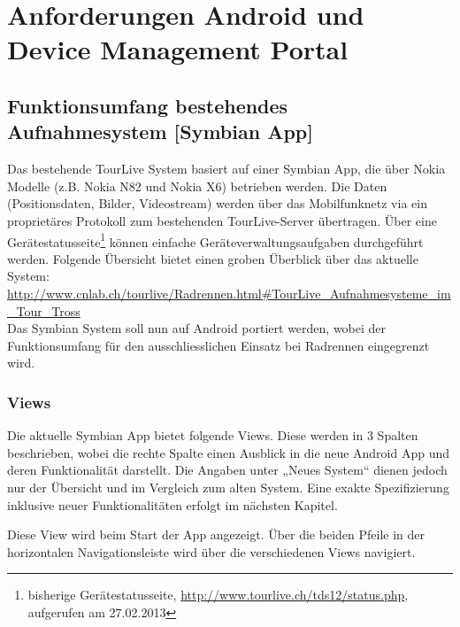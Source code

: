 \section{Anforderungen Android und Device Management Portal}

\subsection{Funktionsumfang bestehendes Aufnahmesystem [Symbian App]}
Das bestehende TourLive System basiert auf einer Symbian App, die über Nokia Modelle (z.B. Nokia N82 und Nokia X6) betrieben werden. Die Daten (Positionsdaten, Bilder, Videostream) werden über das Mobilfunknetz via ein proprietäres Protokoll zum bestehenden TourLive-Server übertragen. Über eine Gerätestatusseite\footnote{bisherige Gerätestatusseite, \url{http://www.tourlive.ch/tds12/status.php}, aufgerufen am 27.02.2013}   können einfache Geräteverwaltungsaufgaben durchgeführt werden. Folgende Übersicht bietet einen groben Überblick über das aktuelle System: \url{
http://www.cnlab.ch/tourlive/Radrennen.html#TourLive_Aufnahmesysteme_im_Tour_Tross} \\

Das Symbian System soll nun auf Android portiert werden, wobei der Funktionsumfang für den ausschliesslichen Einsatz bei Radrennen eingegrenzt wird. 

\subsubsection{Views}
Die aktuelle Symbian App bietet folgende Views. Diese werden in 3 Spalten beschrieben, wobei die rechte Spalte einen Ausblick in die neue Android App und deren Funktionalität darstellt. Die Angaben unter „Neues System“ dienen jedoch nur der Übersicht und im Vergleich zum alten System. Eine exakte Spezifizierung inklusive neuer Funktionalitäten erfolgt im nächsten Kapitel.

Diese View wird beim Start der App angezeigt. Über die beiden Pfeile in der horizontalen Navigationsleiste wird über die verschiedenen Views navigiert.

